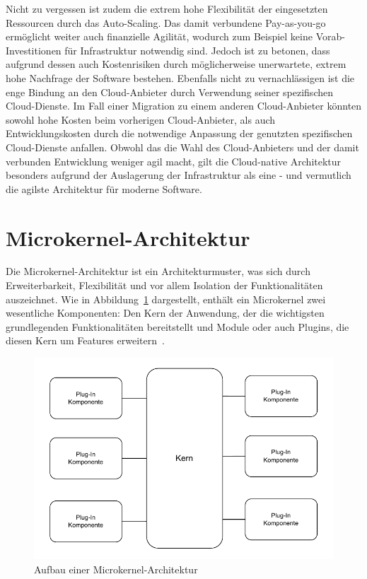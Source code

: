 \documentclass[acmtog]{acmart}
\begin{document}
Nicht zu vergessen ist zudem die extrem hohe Flexibilität der eingesetzten Ressourcen durch das Auto-Scaling.
Das damit verbundene Pay-as-you-go ermöglicht weiter auch finanzielle Agilität, wodurch zum Beispiel keine Vorab-Investitionen für Infrastruktur notwendig sind.
Jedoch ist zu betonen, dass aufgrund dessen auch Kostenrisiken durch möglicherweise unerwartete, extrem hohe Nachfrage der Software bestehen.
Ebenfalls nicht zu vernachlässigen ist die enge Bindung an den Cloud-Anbieter durch Verwendung seiner spezifischen Cloud-Dienste.
Im Fall einer Migration zu einem anderen Cloud-Anbieter könnten sowohl hohe Kosten beim vorherigen Cloud-Anbieter, als auch Entwicklungskosten durch die notwendige
Anpassung der genutzten spezifischen Cloud-Dienste anfallen.
Obwohl das die Wahl des Cloud-Anbieters und der damit verbunden Entwicklung weniger agil macht, gilt die Cloud-native Architektur besonders aufgrund der Auslagerung
der Infrastruktur als eine - und vermutlich die agilste Architektur für moderne Software.

\section{Microkernel-Architektur}
\label{sec:microkernel}
Die Microkernel-Architektur ist ein Architekturmuster, was sich durch Erweiterbarkeit, Flexibilität und vor allem Isolation der Funktionalitäten auszeichnet.
Wie in Abbildung~\ref{fig:microkernel} dargestellt, enthält ein Microkernel zwei wesentliche Komponenten: Den Kern der Anwendung, der die wichtigsten grundlegenden Funktionalitäten bereitstellt und Module oder auch Plugins,
die diesen Kern um Features erweitern~\cite[21-22]{architecturePatterns}.

\begin{figure}[!h]
  \centering
  \includegraphics[width=\linewidth]{images/microkernel/microkernel}
  \caption{Aufbau einer Microkernel-Architektur}
  \label{fig:microkernel}
\end{figure}
\end{document}
